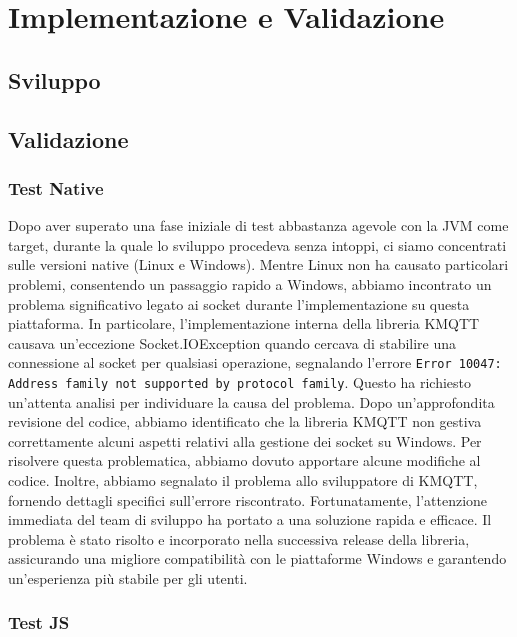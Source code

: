 \documentclass[12pt,a4paper,openright,twoside]{book}
\begin{document}
\chapter{Implementazione e Validazione}\label{chap:Implementazione e Validazione}

\section{Sviluppo}

\section{Validazione}

\subsection{Test Native}
Dopo aver superato una fase iniziale di test abbastanza agevole con la JVM come target, durante la quale lo sviluppo procedeva senza intoppi, ci siamo concentrati 
sulle versioni native (Linux e Windows). Mentre Linux non ha causato particolari problemi, consentendo un passaggio rapido a Windows, abbiamo incontrato un problema 
significativo legato ai socket durante l'implementazione su questa piattaforma.
In particolare, l'implementazione interna della libreria KMQTT causava un'eccezione Socket.IOException quando cercava di stabilire una connessione al socket per 
qualsiasi operazione, segnalando l'errore \texttt{Error 10047: Address family not supported by protocol family}. Questo ha richiesto un'attenta analisi per individuare 
la causa del problema. Dopo un'approfondita revisione del codice, abbiamo identificato che la libreria KMQTT non gestiva correttamente alcuni aspetti relativi alla 
gestione dei socket su Windows.
Per risolvere questa problematica, abbiamo dovuto apportare alcune modifiche al codice. Inoltre, abbiamo segnalato il problema allo sviluppatore di KMQTT, fornendo 
dettagli specifici sull'errore riscontrato. Fortunatamente, l'attenzione immediata del team di sviluppo ha portato a una soluzione rapida e efficace. Il problema è 
stato risolto e incorporato nella successiva release della libreria, assicurando una migliore compatibilità con le piattaforme Windows e garantendo un'esperienza più 
stabile per gli utenti.

\subsection{Test JS}
\end{document}
